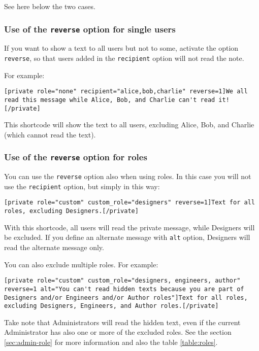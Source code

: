 See here below the two cases.

\subsubsection{Use of the \texttt{reverse} option for single users}

If you want to show a text to all users but not to some, activate the option
\verb+reverse+, so that users added in the \verb+recipient+ option will not read
the note.

For example:

\begin{lstlisting}
[private role="none" recipient="alice,bob,charlie" reverse=1]We all read this message while Alice, Bob, and Charlie can't read it![/private]
\end{lstlisting}

This shortcode will show the text to all users, excluding Alice, Bob, and
Charlie (which cannot read the text).

\subsubsection{Use of the \texttt{reverse} option for roles}

You can use the \verb+reverse+ option also when using roles. In this case you
will not use the \verb+recipient+ option, but simply in this way:

\begin{lstlisting}
[private role="custom" custom_role="designers" reverse=1]Text for all roles, excluding Designers.[/private]
\end{lstlisting}

With this shortcode, all users will read the private message, while Designers
will be excluded. If you define an alternate message with \verb+alt+ option,
Designers will read the alternate message only.

You can also exclude multiple roles. For example:

\begin{lstlisting}
[private role="custom" custom_role="designers, engineers, author" reverse=1 alt="You can't read hidden texts because you are part of Designers and/or Engineers and/or Author roles"]Text for all roles, excluding Designers, Engineers, and Author roles.[/private]
\end{lstlisting}

Take note that Administrators will read the hidden text, even if the current
Administrator has also one or more of the excluded roles. See the section
\ref{sec:admin-role} for more information and also the table \ref{table:roles}.

